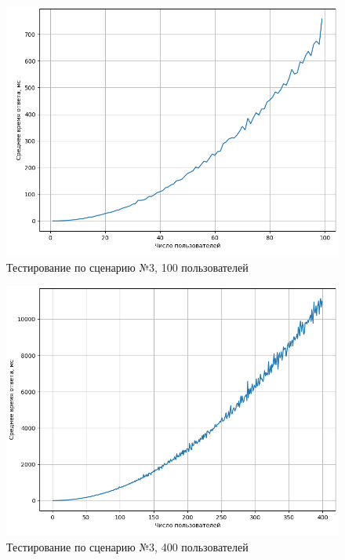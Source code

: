 \begin{figure}[H]
	\begin{center}
		\includegraphics[page=1,scale=0.8]{assets/exp3_100.png}
	\end{center}
	\caption{Тестирование по сценарию №3, 100 пользователей}
	\label{test1_1}
\end{figure}

\begin{figure}[H]
	\begin{center}
		\includegraphics[page=1,scale=0.8]{assets/exp3_400.png}
	\end{center}
	\caption{Тестирование по сценарию №3, 400 пользователей}
	\label{test1_2}
\end{figure}

